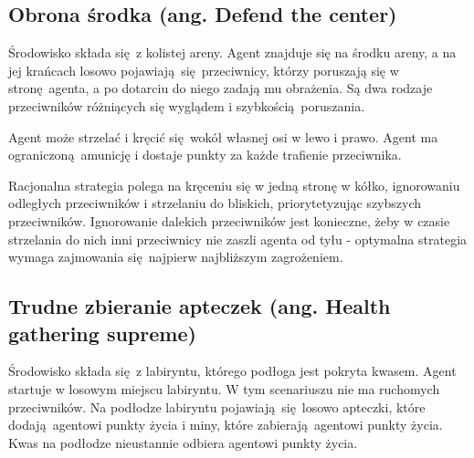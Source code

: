 \subsection{Obrona środka (ang. Defend the center)}\label{scenario_dtc}
Środowisko składa się z kolistej areny. Agent znajduje się na środku areny, a na jej krańcach losowo pojawiają się przeciwnicy, którzy poruszają się w stronę agenta, a po dotarciu do niego zadają mu obrażenia. Są dwa rodzaje przeciwników różniących się wyglądem i szybkością poruszania.

Agent może strzelać i kręcić się wokół własnej osi w lewo i prawo. Agent ma ograniczoną amunicję i dostaje punkty za każde trafienie przeciwnika.

Racjonalna strategia polega na kręceniu się w jedną stronę w kółko, ignorowaniu odległych przeciwników i strzelaniu do bliskich, priorytetyzując szybszych przeciwników. Ignorowanie dalekich przeciwników jest konieczne, żeby w czasie strzelania do nich inni przeciwnicy nie zaszli agenta od tyłu - optymalna strategia wymaga zajmowania się najpierw najbliższym zagrożeniem.

\begin{figure}[H]
	\begin{floatrow}
	\end{floatrow}
\end{figure}


\subsection{Trudne zbieranie apteczek (ang. Health gathering supreme) }\label{scenario_hgs}
Środowisko składa się z labiryntu, którego podłoga jest pokryta kwasem. Agent startuje w losowym miejscu labiryntu. W tym scenariuszu nie ma ruchomych przeciwników. Na podłodze labiryntu pojawiają się losowo apteczki, które dodają agentowi punkty życia i miny, które zabierają agentowi punkty życia. Kwas na podłodze nieustannie odbiera agentowi punkty życia. 

